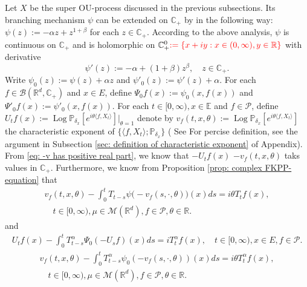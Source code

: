\documentclass[12pt,oneside,english]{amsart}
\theoremstyle{plain}
\theoremstyle{definition}
\numberwithin{equation}{section}
\newcommand{\added}[1]{{\color{blue}#1}}\newcommand{\deleted}[1]{{\color{red}#1}}
\begin{document}
\subsection{}
    Let $X$ be the super OU-process discussed in the previous subsections.
    Its branching mechanism $\psi$ can be extended \added{ on $\mathbb C_+$ by }\deleted{ in the following way: } $\psi(z) := -\alpha z + z^{1+\beta}$ for \added{ each} $z\in \mathbb C_+$.
    According to the above analysis, $\psi$ is continuous on $\mathbb C_+$ and is holomorphic on $\mathbb C_+^0\deleted{:=\{x+iy:x \in (0,\infty), y\in \mathbb R\}}$ with derivative
\begin{equation}
\label{eq: deriavetive of the Poission part}
    \psi'(z) := -\alpha + (1+\beta)z^{\beta},
    \quad z\in \mathbb C_+.
\end{equation}
    Write $\psi_0(z) := \psi(z) + \alpha z$ and $\psi'_0(z) := \psi'(z) + \alpha$.
\added{
    For each $f\in \mathscr B(\mathbb R^d, \mathbb C_+)$ and $x\in E$, define $\Psi_0f(x) := \psi_0(x,f(x))$ and $\Psi'_0 f(x) := \psi'_0(x,f(x))$.
}
    For each $t\in [0,\infty), x\in \mathbb E$ and $f \in \mathcal{P}$, \added{define $U_tf(x) := \operatorname{Log} \mathbb P_{\delta_x}[e^{i\theta \langle f, X_t\rangle}]|_{\theta = 1}$} \deleted{ denote by $v_f(t,x,\theta):= \operatorname{Log} \mathbb P_{\delta_x}[e^{i\theta \langle f, X_t\rangle}]$ the characteristic exponent of $\{\langle f,X_t \rangle; \mathbb P_{\delta_x}\}$}
    (\added{ See }\deleted{ For percise definition, see} the argument in Subsection \ref{sec: definition of characteristic exponent} of Appendix).
    From \eqref{eq: -v has positive real part}, we know that \added{$-U_tf(x)$} \deleted{$- v_f(t,x,\theta)$} taks values in $\mathbb C_+$.
    Furthermore, we know from Proposition \ref{prop: complex FKPP-equation} that
\deleted{
\begin{align}
\label{charequation}
    v_f(t,x,\theta)-\int_0^t T_{t-s} \psi \big(-v_f(s,\cdot,\theta)\big)(x)ds
    =i\theta T_tf(x),
    \\ \quad t\in [0,\infty), \mu\in \mathcal M(\mathbb R^d), f\in \mathcal P, \theta \in \mathbb R.
\end{align}
    and
}
\added{
\begin{align}
\label{eq:chareq2}
    U_tf(x)-\int_0^t T^{\alpha}_{t-s} \Psi_0(-U_sf)(x)ds
    =i T^{\alpha}_t f(x),
    \quad t\in [0,\infty), x\in E, f\in \mathcal P.
\end{align}
}
\deleted{
\begin{align}
\label{eq:chareq2}
    v_f(t,x,\theta)-\int_0^t T^{\alpha}_{t-s} \psi_0(-v_f(s,\cdot,\theta))(x)ds=i\theta T^{\alpha}_t f(x),
    \\ \quad t\in [0,\infty), \mu\in \mathcal M(\mathbb R^d), f\in \mathcal P, \theta \in \mathbb R.
\end{align}
}
\end{document}
